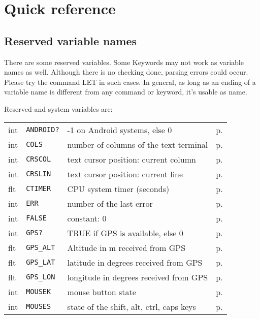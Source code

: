\chapter{Quick reference}

\section{Reserved variable names}

There are some reserved variables. Some Keywords may not work as variable names
as well. Although there is no checking done, parsing errors could  occur. Please
try the command LET in such cases. In general, as long as an ending of a
variable name is different from any command or keyword, it's usable as name.

Reserved and system variables are:
\begin{center}
\begin{longtable}{llll}
int& {\tt ANDROID?}	  & -1 on Android systems, else 0           & p.\pageref{ANDROIDf}\\
int& {\tt COLS    }	  & number of columns of the text terminal  & p.\pageref{COLS}    \\
int& {\tt CRSCOL  }	  & text cursor position: current column    & p.\pageref{CRSCOL}  \\
int& {\tt CRSLIN  }	  & text cursor position: current line      & p.\pageref{CRSLIN}  \\
flt& {\tt CTIMER  }	  & CPU system timer (seconds)              & p.\pageref{CTIMER}  \\
int& {\tt ERR     }	  & number of the last error                & p.\pageref{ERR}\\
int& {\tt FALSE   } 	  & constant: 0                             & p.\pageref{FALSE}\\
int& {\tt GPS?    } 	  & TRUE if GPS is available, else 0        & p.\pageref{GPSf}\\
flt& {\tt GPS\_ALT } 	  & Altitude in m received from GPS         & p.\pageref{GPSiALT}\\
flt& {\tt GPS\_LAT } 	  & latitude in degrees received from GPS   & p.\pageref{GPSiLAT}\\
flt& {\tt GPS\_LON } 	  & longitude in degrees received from GPS  & p.\pageref{GPSiLON}\\
int& {\tt MOUSEK   } 	  & mouse button state                      & p.\pageref{MOUSEK}\\
int& {\tt MOUSES   } 	  & state of the shift, alt, ctrl, caps keys & p.\pageref{MOUSES}\\

\end{longtable}
\end{center}

